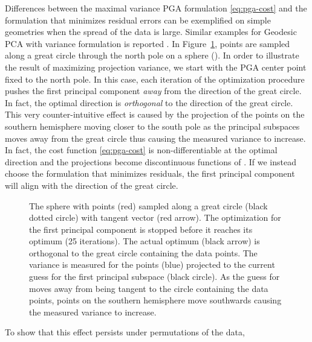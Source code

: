 \documentclass[final]{svjour3}
\begin{document}
Differences between the maximal variance PGA formulation
\eqref{eq:pga-cost} and the formulation that minimizes residual errors can be
exemplified on simple geometries when the spread of the data is large.
Similar examples for Geodesic PCA with variance formulation is reported \cite{huckemann_intrinsic_2010}.
In Figure~\ref{fig:sphere-orth}, points are sampled along a great circle through
the north pole on a sphere (). In order to illustrate the result of
maximizing projection variance, we start with the PGA center point fixed to
the north pole. In this case, each iteration of the optimization procedure
pushes the first principal component  \emph{away} from the direction of the great
circle. In fact, the optimal direction is \emph{orthogonal} to the direction of
the great circle. This very counter-intuitive effect is caused by the projection of the
points on the southern hemisphere moving closer to the south pole as the principal
subspaces moves away from the great circle thus causing the measured variance to
increase. In fact, the cost function \eqref{eq:pga-cost}
is non-differentiable at the optimal direction and the projections become
discontinuous functions of . If we instead choose the formulation that
minimizes residuals, the first principal component will align with the direction
of the great circle.
\begin{figure}[h]
    \begin{center}
    \end{center}
    \caption{The sphere  with points (red) sampled along a great circle
    (black dotted circle) with tangent vector (red arrow). The optimization for the first principal 
    component  is stopped before it reaches its optimum (25
    iterations). The actual optimum (black arrow) is orthogonal to the
    great circle containing the data points. The variance is measured for the points (blue) projected to
    the current guess for the first principal subspace (black circle). 
    As the guess for  moves away from being tangent to the circle containing the data points,
    points on
    the southern hemisphere move southwards 
    causing the measured variance to increase.
}
    \label{fig:sphere-orth}
\end{figure}
To show that this effect persists under permutations of the data,
\end{document}
